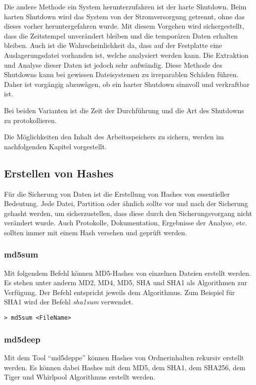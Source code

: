 Die andere Methode ein System herunterzufahren ist der harte Shutdown. Beim harten Shutdown wird das System von der Stromversorgung getrennt, ohne das dieses vorher heruntergefahren wurde. Mit diesem Vorgehen wird sichergestellt, dass die Zeitstempel unverändert bleiben und die temporären Daten erhalten bleiben. Auch ist die Wahrscheinlichkeit da, dass auf der Festplatte eine Auslagerungsdatei vorhanden ist, welche analysiert werden kann. Die Extraktion und Analyse dieser Daten ist jedoch sehr aufwändig. Diese Methode des Shutdowns kann bei gewissen Dateisystemen zu irreparablen Schäden führen. Daher ist vorgängig abzuwägen, ob ein harter Shutdown sinnvoll und verkraftbar ist.

Bei beiden Varianten ist die Zeit der Durchführung und die Art des Shutdowns zu protokollieren.

Die Möglichkeiten den Inhalt des Arbeitsspeichers zu sichern, werden im nachfolgenden Kapitel vorgestellt.



\subsection{Erstellen von Hashes} \label{subsec:ToolsTechniques:Secure:Hash}
Für die Sicherung von Daten ist die Erstellung von Hashes von essentieller Bedeutung. Jede Datei, Partition oder ähnlich sollte vor und nach der Sicherung gehasht werden, um sicherzustellen, dass diese durch den Sicherungsvorgang nicht verändert wurde. Auch Protokolle, Dokumentation, Ergebnisse der Analyse, etc. sollten immer mit einem Hash versehen und geprüft werden.

\subsubsection{md5sum}
Mit folgendem Befehl können MD5-Hashes von einzelnen Dateien erstellt werden. Es stehen unter anderm MD2, MD4, MD5, SHA und SHA1 als Algorithmen zur Verfügung. Der Befehl entspricht jeweils dem Algorithmus. Zum Beispiel für SHA1 wird der Befehl \textit{sha1sum} verwendet.

\begin{lstlisting}
> md5sum <FileName>
\end{lstlisting}

\subsubsection{md5deep}
Mit dem Tool "`md5deppe"' können Hashes von Ordnerinhalten rekursiv erstellt werden. Es können dabei Hashes mit dem MD5, dem SHA1, dem SHA256, dem Tiger und Whirlpool Algorithmus erstellt werden.


